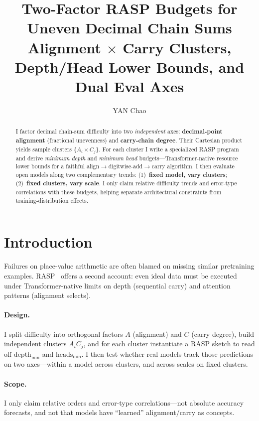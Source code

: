 \documentclass[11pt]{article}
\title{Two-Factor RASP Budgets for Uneven Decimal Chain Sums\\
\large Alignment $\times$ Carry Clusters, Depth/Head Lower Bounds, and Dual Eval Axes}
\author{YAN Chao}
\date{}
\begin{document}
\maketitle

\begin{abstract}
I factor decimal chain-sum difficulty into two \emph{independent} axes:
\textbf{decimal-point alignment} (fractional unevenness) and \textbf{carry-chain degree}.
Their Cartesian product yields sample clusters $\{A_i\times C_j\}$.
For each cluster I write a specialized RASP program and derive
\emph{minimum depth} and \emph{minimum head} budgets---Transformer-native resource
lower bounds for a faithful align$\to$digitwise-add$\to$carry algorithm.
I then evaluate open models along two complementary trends:
(1)~\textbf{fixed model, vary clusters}; (2)~\textbf{fixed clusters, vary scale}.
I only claim relative difficulty trends and error-type correlations with these budgets,
helping separate architectural constraints from training-distribution effects.
\end{abstract}

\section{Introduction}

Failures on place-value arithmetic are often blamed on missing similar pretraining
examples. RASP~\cite{weiss2021rasp} offers a second account: even ideal data must be
executed under Transformer-native limits on depth (sequential carry) and attention
patterns (alignment selects).

\paragraph{Design.}
I split difficulty into orthogonal factors $A$ (alignment) and $C$ (carry degree),
build independent clusters $A_iC_j$, and for each cluster instantiate a RASP sketch
to read off $\mathrm{depth}_{\min}$ and $\mathrm{heads}_{\min}$.
I then test whether real models track those predictions on two axes---within a model
across clusters, and across scales on fixed clusters.

\paragraph{Scope.}
I only claim relative orders and error-type correlations---not absolute accuracy
forecasts, and not that models have ``learned'' alignment/carry as concepts.
\end{document}
